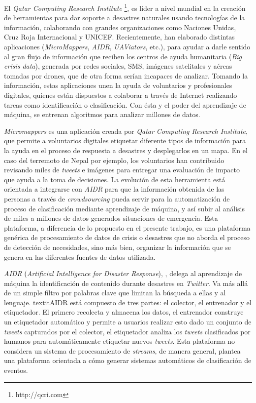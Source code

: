 El \textit{Qatar Computing Research Institute} \footnote{http://qcri.com}, es líder a nivel mundial en la creación de herramientas para dar soporte a desastres naturales usando tecnologías de la información, colaborando con grandes organizaciones como Naciones Unidas, Cruz Roja Internacional y UNICEF. Recientemente, han elaborado distintas aplicaciones (\textit{MicroMappers}, \textit{AIDR}, \textit{UAViators}, etc.), para ayudar a darle sentido al gran flujo de información que reciben los centros de ayuda humanitaria (\textit{Big crisis data}), generada por redes sociales, SMS, imágenes satelitales y aéreas tomadas por drones, que de otra forma serían incapaces de analizar.
Tomando la información, estas aplicaciones unen la ayuda de voluntarios y profesionales digitales, quienes están dispuestos a colaborar a través de Internet realizando tareas como identificación o clasificación. Con ésta y el poder del aprendizaje de máquina, se entrenan algoritmos para analizar millones de datos.

\textit{Micromappers} \cite{MicroMappers} es una aplicación creada por \textit{Qatar Computing Research Institute}, que permite a voluntarios digitales etiquetar diferente tipos de información para la ayuda en el proceso de respuesta a desastres y desplegarlos en un mapa. En el caso del terremoto de Nepal por ejemplo, los voluntarios han contribuido revisando miles de \textit{tweets} e imágenes para entregar una evaluación de impacto que ayuda a la toma de decisiones. La evolución de esta herramienta está orientada a integrarse con \textit{AIDR} para que la información obtenida de las personas a través de \textit{crowdsourcing} pueda servir para la automatización de proceso de clasificación mediante aprendizaje de máquina, y así subir al análisis de miles a millones de datos generados situaciones de emergencia. Esta plataforma, a diferencia de lo propuesto en el presente trabajo, es una plataforma genérica de procesamiento de datos de crisis o desastres que no aborda el proceso de detección de necesidades, sino más bien, organizar la información que se genera en las diferentes fuentes de datos utilizada.

\textit{AIDR} (\textit{Artificial Intelligence for Disaster Response}), \cite{AIDR}, delega al aprendizaje de máquina la identificación de contenido durante desastres en \textit{Twitter}. Va más allá de un simple filtro por palabras clave que limitan la búsqueda a ellas y al lenguaje. textit{AIDR} está compuesto de tres partes: el colector, el entrenador y el etiquetador. El primero recolecta y almacena los datos, el entrenador construye un etiquetador automático y permite a usuarios realizar esto dado un conjunto de \textit{tweets} capturados por el colector, el etiquetador analiza los \textit{tweets} clasificados por humanos para automáticamente etiquetar nuevos \textit{tweets}. Esta plataforma no considera un sistema de procesamiento de \textit{streams}, de manera general, plantea una plataforma orientada a cómo generar sistemas automáticos de clasificación de eventos.

